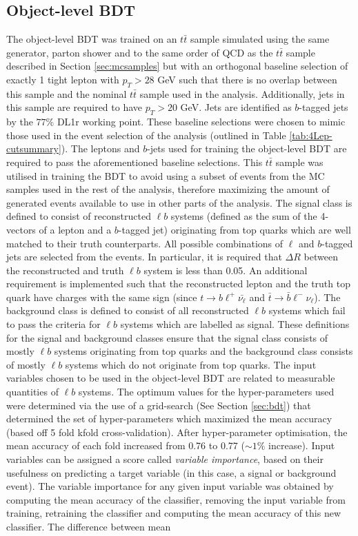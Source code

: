 \subsection{Object-level BDT}
\label{sec:object-level-bdt}
The object-level BDT was trained on an $t\bar{t}$ sample simulated using the same generator, parton shower and to the same order of QCD as the $t\bar{t}$ sample described in Section \ref{sec:mcsamples} but with an orthogonal baseline selection of exactly 1 tight lepton with $p_{T} > 28$ GeV such that there is no overlap between this sample and the nominal $t\bar{t}$ sample used in the analysis. Additionally, jets in this sample are required to have $p_{T} > 20$ GeV. Jets are identified as $b$-tagged jets by the $77\%$ DL1r working point. These baseline selections were chosen to mimic those used in the event selection of the analysis (outlined in Table \ref{tab:4Lep-cutsummary}). The leptons and $b$-jets used for training the object-level BDT are required to pass the aforementioned baseline selections. This $t\bar{t}$ sample was utilised in training the BDT to avoid using a subset of events from the MC samples used in the rest of the analysis, therefore maximizing the amount of generated events available to use in other parts of the analysis. The signal class is defined to consist of reconstructed $\ell b$ systems (defined as the sum of the 4-vectors of a lepton and a $b$-tagged jet) originating from top quarks which are well matched to their truth counterparts. All possible combinations of $\ell$ and $b$-tagged jets are selected from the events. In particular, it is required that $\Delta R$ between the reconstructed and truth $\ell b$ system is less than 0.05. An additional requirement is implemented such that the reconstructed lepton and the truth top quark have charges with the same sign (since $t\rightarrow b\ell^{+}\bar{\nu_{\ell}}$ and $\bar{t}\rightarrow \bar{b}\ell^{-}\nu_{\ell}$). The background class is defined to consist of all reconstructed $\ell b$ systems which fail to pass the criteria for $\ell b$ systems which are labelled as signal. These definitions for the signal and background classes ensure that the signal class consists of mostly $\ell b$ systems originating from top quarks and the background class consists of mostly $\ell b$ systems which do not originate from top quarks. The input variables chosen to be used in the object-level BDT are related to measurable quantities of $\ell b$ systems. The optimum values for the hyper-parameters used were determined via the use of a grid-search (See Section \ref{sec:bdt}) that determined the set of hyper-parameters which maximized the mean accuracy (based off 5 fold kfold cross-validation). After hyper-parameter optimisation, the mean accuracy of each fold increased from 0.76 to 0.77 ($\sim 1\%$ increase). Input variables can be assigned a score called \textit{variable importance}, based on their usefulness on predicting a target variable (in this case, a signal or background event). The variable importance for any given input variable was obtained by computing the mean accuracy of the classifier, removing the input variable from training, retraining the classifier and computing the mean accuracy of this new classifier. The difference between mean 